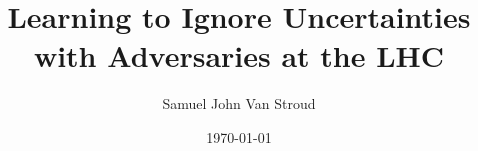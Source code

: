 \documentclass[draft]{uclthesis} %
\title{Learning to Ignore Uncertainties with Adversaries at the LHC}
\author{Samuel John Van Stroud\xspace}
\date{\today}
\begin{document}
\begin{frontmatter}
  
\end{frontmatter}

\begin{mainmatter}
  
  
  
  
  
  
  
  
\end{mainmatter}

\begin{appendices}
  
\end{appendices}

\begin{backmatter}
  
\end{backmatter}

\end{document}
